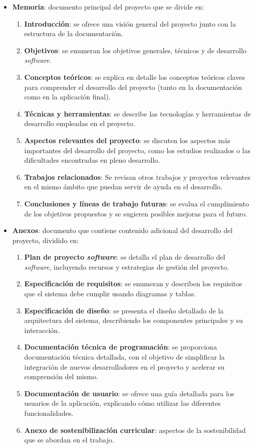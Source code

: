 \begin{itemize}
	\item \textbf{Memoria}: documento principal del proyecto que se divide en:
	\begin{enumerate}
		\item \textbf{Introducción}: se ofrece una visión general del proyecto junto con la estructura de la documentación.
		\item \textbf{Objetivos}: se enumeran los objetivos generales, técnicos y de desarrollo \textit{software}.
		\item \textbf{Conceptos teóricos}: se explica en detalle los conceptos teóricos claves para comprender el desarrollo del proyecto (tanto en la documentación como en la aplicación final).
		\item \textbf{Técnicas y herramientas}: se describe las tecnologías y herramientas de desarrollo empleadas en el proyecto.
		\item \textbf{Aspectos relevantes del proyecto}: se discuten los aspectos más importantes del desarrollo del proyecto, como los estudios realizados o las dificultades encontradas en pleno desarrollo.
		\item \textbf{Trabajos relacionados}: Se revisan otros trabajos y proyectos relevantes en el mismo ámbito que puedan servir de ayuda en el desarrollo.
		\item \textbf{Conclusiones y líneas de trabajo futuras}: se evalua el cumplimiento de los objetivos propuestos y se sugieren posibles mejoras para el futuro.
	\end{enumerate}
	\item \textbf{Anexos}: documento que contiene contenido adicional del desarrollo del proyecto, dividido en:
	\begin{enumerate}
		\item \textbf{Plan de proyecto \textit{software}}: se detalla el plan de desarrollo del \textit{software}, incluyendo recursos y estrategias de gestión del proyecto.
		\item \textbf{Especificación de requisitos}: se enumeran y describen los requisitos que el sistema debe cumplir usando diagramas y tablas.
		\item \textbf{Especificación de diseño}: se presenta el diseño detallado de la arquitectura del sistema, describiendo los componentes principales y su interacción.
		\item \textbf{Documentación técnica de programación}: se proporciona documentación técnica detallada, con el objetivo de simplificar la integración de nuevos desarrolladores en el proyecto y acelerar su comprensión del mismo.
		\item \textbf{Documentación de usuario}: se ofrece una guía detallada para los usuarios de la aplicación, explicando cómo utilizar las diferentes funcionalidades.
		\item \textbf{Anexo de sostenibilización curricular}: aspectos de la sostenibilidad que se abordan en el trabajo.
	\end{enumerate}
\end{itemize}


